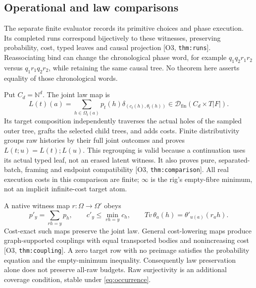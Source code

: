 \documentclass[11pt,a4paper]{article}
\theoremstyle{definition}
\newcommand{\Dfin}{\mathcal D_{\mathrm{fin}}}
\newcommand{\Addr}[2]{\textup{[#1, \texttt{#2}]}}
\begin{document}
\subsection{Operational and law comparisons}
The separate finite evaluator records its primitive choices and phase
execution. Its completed runs correspond bijectively to these witnesses,
preserving probability, cost, typed leaves and causal projection
\Addr{O3}{thm:runs}. Reassociating bind can change the chronological
phase word, for example \(q_1q_2r_1r_2\) versus
\(q_1r_1q_2r_2\), while retaining the same causal tree. No theorem here
asserts equality of those chronological words.

Put \(C_d=\mathbb N^d\). The joint law map is
\[
 L(t)(a)=\sum_{h\in\Omega_t(a)}p_t(h)\delta_{(c_t(h),\theta_t(h))}
       \in\Dfin(C_d\times T|F|).
\]
Its target composition independently traverses the actual holes of the
sampled outer tree, grafts the selected child trees, and adds costs.
Finite distributivity groups raw histories by their full joint outcomes
and proves \(L(t;u)=L(t);L(u)\). This regrouping is valid because a
continuation uses its actual typed leaf, not an erased latent witness.
It also proves pure, separated-batch, framing and endpoint compatibility
\Addr{O3}{thm:comparison}. All real execution costs in this comparison
are finite; \(\infty\) is the rig's empty-fibre minimum, not an implicit
infinite-cost target atom.

A native witness map \(r:\Omega\to\Omega'\) obeys
\begin{equation}\label{eq:native}
 p'_y=\sum_{rh=y}p_h,\qquad c'_y\le\min_{rh=y}c_h,
 \qquad Tv\,\theta_a(h)=\theta'_{u(a)}(r_a h).
\end{equation}
Cost-exact such maps preserve the joint law. General cost-lowering maps
produce graph-supported couplings with equal transported bodies and
nonincreasing cost \Addr{O3}{thm:coupling}. A zero target row with no
preimage satisfies the probability equation and the empty-minimum
inequality. Consequently law preservation alone does not preserve all-raw
budgets. Raw surjectivity is an additional coverage condition, stable
under \eqref{eq:occurrence}.
\end{document}
